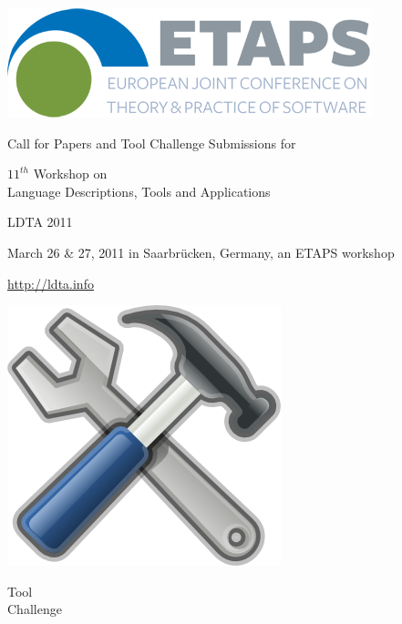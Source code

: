 \documentclass[10pt,A4paper]{article} \usepackage{graphicx,url}
\begin{document}
\noindent
\begin{minipage}[b][1.6in][t]{1in}
\includegraphics[width=1.0\columnwidth]{images/etapsLogo.png}

\end{minipage}
\begin{minipage}[b][1.6in][t]{5in}
\begin{center}
Call for Papers and Tool Challenge Submissions for

\vspace{2mm}

{\Large $11^{th}$ Workshop on \\
Language Descriptions, Tools and Applications}

\vspace{3mm}

{\Large LDTA 2011}

\vspace{3mm}

March 26 \& 27, 2011 in Saarbr\"ucken, Germany, an ETAPS workshop

\vspace{2mm}

\url{http://ldta.info}
\end{center}
\end{minipage}
\begin{minipage}[b][1.6in][t]{1in}
\includegraphics[width=1.0\columnwidth]{images/Tools.png}
\vspace{-8mm}
\begin{center}
Tool \\
Challenge
\end{center}
\end{minipage}
\end{document}
